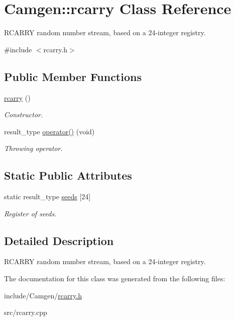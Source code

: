\hypertarget{a00472}{}\section{Camgen\+:\+:rcarry Class Reference}
\label{a00472}


R\+C\+A\+R\+R\+Y random number stream, based on a 24-\/integer registry.  




{\ttfamily \#include $<$rcarry.\+h$>$}

\subsection*{Public Member Functions}
\begin{DoxyCompactItemize}
\item 
\hypertarget{a00472_a0e420f36cb6c848d59a895d8c03fff03}{}\hyperlink{a00472_a0e420f36cb6c848d59a895d8c03fff03}{rcarry} ()\label{a00472_a0e420f36cb6c848d59a895d8c03fff03}

\begin{DoxyCompactList}\small\item\em Constructor. \end{DoxyCompactList}\item 
\hypertarget{a00472_a053f910e707aa0e6286d9271479cc5ae}{}result\+\_\+type \hyperlink{a00472_a053f910e707aa0e6286d9271479cc5ae}{operator()} (void)\label{a00472_a053f910e707aa0e6286d9271479cc5ae}

\begin{DoxyCompactList}\small\item\em Throwing operator. \end{DoxyCompactList}\end{DoxyCompactItemize}
\subsection*{Static Public Attributes}
\begin{DoxyCompactItemize}
\item 
\hypertarget{a00472_ade12e5b44bddb5dafc21f20a4ec20bf5}{}static result\+\_\+type \hyperlink{a00472_ade12e5b44bddb5dafc21f20a4ec20bf5}{seeds} \mbox{[}24\mbox{]}\label{a00472_ade12e5b44bddb5dafc21f20a4ec20bf5}

\begin{DoxyCompactList}\small\item\em Register of seeds. \end{DoxyCompactList}\end{DoxyCompactItemize}


\subsection{Detailed Description}
R\+C\+A\+R\+R\+Y random number stream, based on a 24-\/integer registry. 

The documentation for this class was generated from the following files\+:\begin{DoxyCompactItemize}
\item 
include/\+Camgen/\hyperlink{a00757}{rcarry.\+h}\item 
src/rcarry.\+cpp\end{DoxyCompactItemize}
